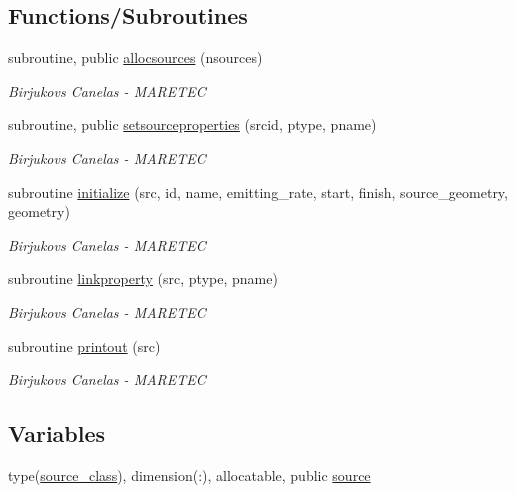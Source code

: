 \subsection*{Functions/\+Subroutines}
\begin{DoxyCompactItemize}
\item 
subroutine, public \mbox{\hyperlink{namespacesource__identity_a716b4cb4acec5756a6d4dcf20eee588e}{allocsources}} (nsources)
\begin{DoxyCompactList}\small\item\em Birjukovs Canelas -\/ M\+A\+R\+E\+T\+EC \end{DoxyCompactList}\item 
subroutine, public \mbox{\hyperlink{namespacesource__identity_abf228e9179ba7c28cc5de2f63562ac25}{setsourceproperties}} (srcid, ptype, pname)
\begin{DoxyCompactList}\small\item\em Birjukovs Canelas -\/ M\+A\+R\+E\+T\+EC \end{DoxyCompactList}\item 
subroutine \mbox{\hyperlink{namespacesource__identity_a8d7aaa58c575f6ed78f5ca29d64615d7}{initialize}} (src, id, name, emitting\+\_\+rate, start, finish, source\+\_\+geometry, geometry)
\begin{DoxyCompactList}\small\item\em Birjukovs Canelas -\/ M\+A\+R\+E\+T\+EC \end{DoxyCompactList}\item 
subroutine \mbox{\hyperlink{namespacesource__identity_a43fd5b86e85ddeadf982708445286e26}{linkproperty}} (src, ptype, pname)
\begin{DoxyCompactList}\small\item\em Birjukovs Canelas -\/ M\+A\+R\+E\+T\+EC \end{DoxyCompactList}\item 
subroutine \mbox{\hyperlink{namespacesource__identity_a9715a7d707b4c80aa2d2ebd08712f6a9}{printout}} (src)
\begin{DoxyCompactList}\small\item\em Birjukovs Canelas -\/ M\+A\+R\+E\+T\+EC \end{DoxyCompactList}\end{DoxyCompactItemize}
\subsection*{Variables}
\begin{DoxyCompactItemize}
\item 
type(\mbox{\hyperlink{structsource__identity_1_1source__class}{source\+\_\+class}}), dimension(\+:), allocatable, public \mbox{\hyperlink{namespacesource__identity_a5ed8006613af7461c6a2ff1cdaeb8f0f}{source}}
\end{DoxyCompactItemize}


